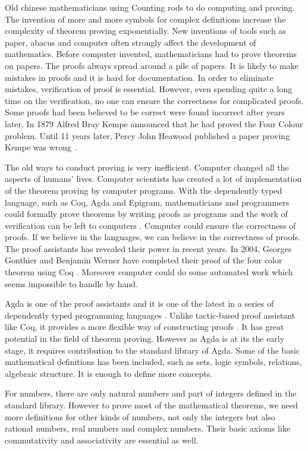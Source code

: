 \documentclass{article}
\theoremstyle{definition}
\begin{document}
Old chinese mathematicians using Counting rods to do computing and proving. The invention of more and more symbols for complex definitions increase the complexity of theorem proving exponentially. New inventions of tools such as paper, abacus and computer often strongly affect the development of mathematics. Before computer invented, mathematicians had to prove theorems on papers. The proofs always spread around a pile of papers. It is likely to make mistakes in proofs and it is hard for documentation. In order to eliminate mistakes, verification of proof is essential. However, even spending quite a long time on the verification, no one can ensure the correctness for complicated proofs. Some proofs had been believed to be correct were found incorrect after years later. In 1879 Alfred Bray Kempe announced that he had proved the Four Colour problem. Until 11 years later, Percy John Heawood published a paper proving Kempe was wrong \cite{wiki:4colour}. 

The old ways to conduct proving is very inefficient. Computer changed all the aspects of humans' lives. Computer scientists has created a lot of implementation of the theorem proving by computer programs. With the dependently typed language, such as Coq, Agda and Epigram, mathematicians and programmers could formally prove theorems by writing proofs as programs and the work of verification can be left to computers \cite{alti:ydtm}. Computer could ensure the correctness of proofs. If we believe in the languages, we can believe in the correctness of proofs. The proof assistants has revealed their power in recent years. In 2004, Georges Gonthier and Benjamin Werner have completed their proof of the four color theorem using Coq \cite{wiki:Coq}. Moreover computer could do some automated work which seems impossible to handle by hand.

Agda is one of the proof assistants and it is one of the latest in a series of dependently typed programming languages \cite{aboa}. Unlike tactic-based proof assistant like Coq, it provides a more flexible way of constructing proofs \cite{alti:ydtm}. It has great potential in the field of theorem proving. However as Agda is at its the early stage, it requires contribution to the standard library of Agda. Some of the basic mathematical definitions has been included, such as sets, logic symbols, relations, algebraic structure. It is enough to define more concepts.

For numbers, there are only natural numbers and part of integers defined in the standard library. However to prove most of the mathematical theorems, we need more definitions for other kinds of numbers, not only the integers but also rational numbers, real numbers and complex numbers. Their basic axioms like commutativity and associativity are essential as well.
\end{document}
